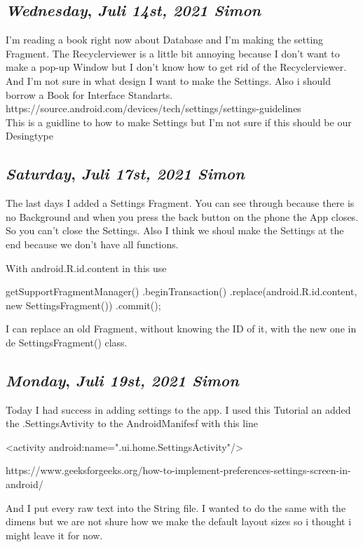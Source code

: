 \begin{center}
\section*{\month}
\end{center}


\def\day{\textit{Juli 14st, 2021 Simon}}
\def\weekday{\textit{Wednesday}}
\subsection*{\weekday, \day}

I'm reading a book right now about Database and I'm making the setting Fragment. The Recyclerviewer is a little bit annoying 
because I don't want to make a pop-up Window but I don't know how to get rid of the Recyclerviewer. And I'm not sure in what design 
I want to make the Settings. Also i should borrow a Book for Interface Standarts.
\\
https://source.android.com/devices/tech/settings/settings-guidelines
\\
This is a guidline to how to make Settings but I'm not sure if this should be our Desingtype


\def\day{\textit{Juli 17st, 2021 Simon}}
\def\weekday{\textit{Saturday}}
\subsection*{\weekday, \day}

The last days I added a Settings Fragment. You can see through because there is no Background and when you press the back button on the phone
the App closes. So you can't close the Settings. Also I think we shoul make the Settings at the end because we don't have 
all functions. 

With android.R.id.content in this use

getSupportFragmentManager()
                        .beginTransaction()
                        .replace(android.R.id.content, new SettingsFragment())
                        .commit();

I can replace an old Fragment, without knowing the ID of it, with the new one in de SettingsFragment() class.


\def\day{\textit{Juli 19st, 2021 Simon}}
\def\weekday{\textit{Monday}}
\subsection*{\weekday, \day}

Today I had success in adding settings to the app. 
I used this Tutorial an added the .SettingsAvtivity to the AndroidManifesf with this line 

<activity android:name=".ui.home.SettingsActivity"/>

https://www.geeksforgeeks.org/how-to-implement-preferences-settings-screen-in-android/

And I put every raw text into the String file. 
I wanted to do the same with the dimens but we are not shure how we make the default layout sizes 
so i thought i might leave it for now.


